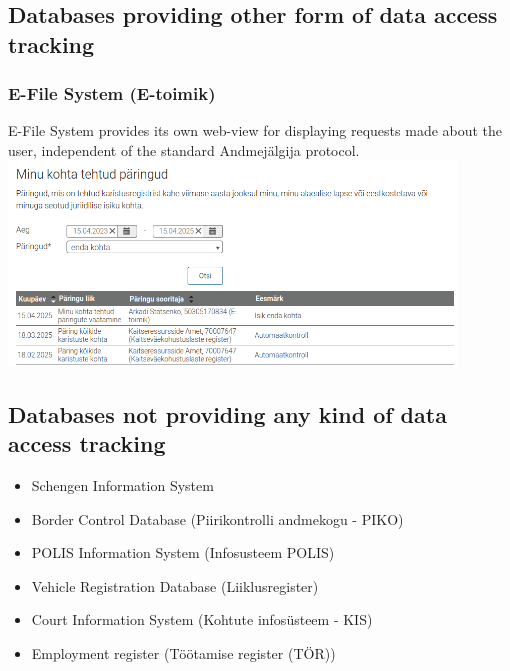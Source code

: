 \subsection{Databases providing other form of data access tracking}

\subsubsection{E-File System (E-toimik)}
E-File System provides its own web-view for displaying requests made about the user, independent of the standard Andmejälgija protocol.
\includegraphics[width=450px]{english/figures/e-toimik.png}

\subsection{Databases not providing any kind of data access tracking}
\begin{itemize}
    \item Schengen Information System
    \item Border Control Database (Piirikontrolli andmekogu - PIKO)
    \item POLIS Information System (Infosusteem POLIS)
    \item Vehicle Registration Database (Liiklusregister)
    \item Court Information System (Kohtute infosüsteem - KIS)
    \item Employment register (Töötamise register (TÖR))

\end{itemize}


